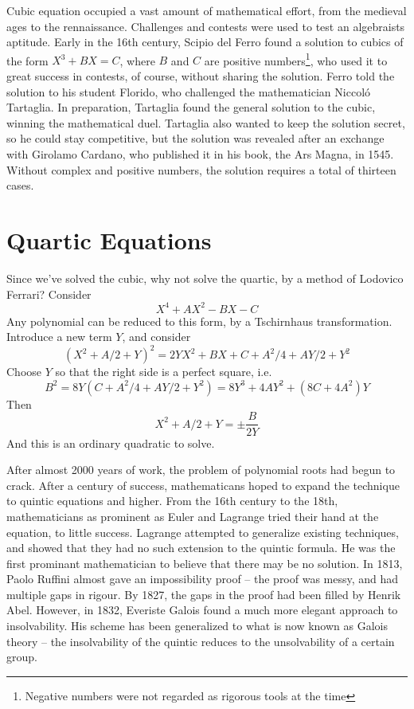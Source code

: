 Cubic equation occupied a vast amount of mathematical effort, from the medieval ages to the rennaissance. Challenges and contests were used to test an algebraists aptitude. Early in the 16th century, Scipio del Ferro found a solution to cubics of the form $X^3 + BX = C$, where $B$ and $C$ are positive numbers\footnote{Negative numbers were not regarded as rigorous tools at the time}, who used it to great success in contests, of course, without sharing the solution. Ferro told the solution to his student Florido, who challenged the mathematician Niccol\'{o} Tartaglia. In preparation, Tartaglia found the general solution to the cubic, winning the mathematical duel. Tartaglia also wanted to keep the solution secret, so he could stay competitive, but the solution was revealed after an exchange with Girolamo Cardano, who published it in his book, the Ars Magna, in 1545. Without complex and positive numbers, the solution requires a total of thirteen cases.

\section{Quartic Equations}

Since we've solved the cubic, why not solve the quartic, by a method of Lodovico Ferrari? Consider
%
\[ X^4 + AX^2 - BX - C \]
%
Any polynomial can be reduced to this form, by a Tschirnhaus transformation. Introduce a new term $Y$, and consider
%
\[ (X^2 + A/2 + Y)^2 = 2YX^2 + BX + C + A^2/4 + AY/2 + Y^2 \]
%
Choose $Y$ so that the right side is a perfect square, i.e.
%
\[ B^2 = 8Y(C + A^2/4 + AY/2 + Y^2) = 8Y^3 + 4AY^2 + (8C + 4A^2)Y \]
%
Then
%
\[ X^2 + A/2 + Y = \pm \frac{B}{2Y} \]
%
And this is an ordinary quadratic to solve.

After almost 2000 years of work, the problem of polynomial roots had begun to crack. After a century of success, mathematicans hoped to expand the technique to quintic equations and higher. From the 16th century to the 18th, mathematicians as prominent as Euler and Lagrange tried their hand at the equation, to little success. Lagrange attempted to generalize existing techniques, and showed that they had no such extension to the quintic formula. He was the first prominant mathematician to believe that there may be no solution. In 1813, Paolo Ruffini almost gave an impossibility proof -- the proof was messy, and had multiple gaps in rigour. By 1827, the gaps in the proof had been filled by Henrik Abel. However, in 1832, Everiste Galois found a much more elegant approach to insolvability. His scheme has been generalized to what is now known as Galois theory -- the insolvability of the quintic reduces to the unsolvability of a certain group.

